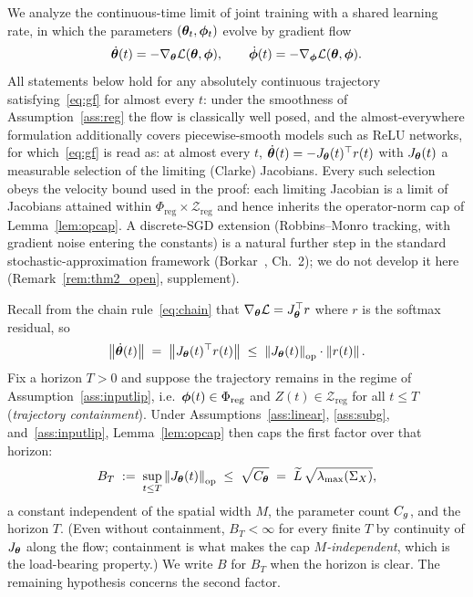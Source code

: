 We analyze the continuous-time limit of joint training with a shared
learning rate, in which the parameters $({\boldsymbol{\theta}}_t, {\boldsymbol{\phi}}_t)$ evolve
by gradient flow
\begin{equation}
\label{eq:gf}
    \dot{{\boldsymbol{\theta}}}(t) = -\nabla_{\boldsymbol{\theta}} \mathcal{L}({\boldsymbol{\theta}}, {\boldsymbol{\phi}}),
    \qquad
    \dot{{\boldsymbol{\phi}}}(t) = -\nabla_{\boldsymbol{\phi}} \mathcal{L}({\boldsymbol{\theta}}, {\boldsymbol{\phi}}).
\end{equation}
All statements below hold for any absolutely continuous trajectory
satisfying~\eqref{eq:gf} for almost every $t$: under the smoothness
of Assumption~\ref{ass:reg} the flow is classically well posed, and
the almost-everywhere formulation additionally covers
piecewise-smooth models such as ReLU networks, for
which~\eqref{eq:gf} is read as: at almost every $t$,
$\dot{{\boldsymbol{\theta}}}(t) = -J_{\boldsymbol{\theta}}(t)^\top r(t)$ with $J_{\boldsymbol{\theta}}(t)$ a
measurable selection of the limiting (Clarke) Jacobians. Every
such selection obeys the velocity bound used in the proof: each
limiting Jacobian is a limit of Jacobians attained within
$\Phi_{\mathrm{reg}} \times \mathcal{Z}_{\mathrm{reg}}$ and hence
inherits the operator-norm cap of Lemma~\ref{lem:opcap}. A discrete-SGD extension (Robbins--Monro tracking, with
gradient noise entering the constants) is a natural further step in
the standard stochastic-approximation framework
(Borkar~\cite{borkar2008stochastic}, Ch.~2); we do not develop it
here (Remark~\ref{rem:thm2_open}, supplement).

Recall from the chain rule~\eqref{eq:chain} that
$\nabla_{\boldsymbol{\theta}} \mathcal{L} = J_{\boldsymbol{\theta}}^\top r$ where $r$ is the softmax
residual, so
\begin{equation}
\label{eq:theta_grad_bound}
    \left\lVert\dot{{\boldsymbol{\theta}}}(t)\right\rVert
    \;=\; \left\lVert J_{\boldsymbol{\theta}}(t)^\top r(t)\right\rVert
    \;\leq\; \left\lVert J_{\boldsymbol{\theta}}(t)\right\rVert_{\mathrm{op}} \cdot \left\lVert r(t)\right\rVert.
\end{equation}
Fix a horizon $T > 0$ and suppose the trajectory remains in the
regime of Assumption~\ref{ass:inputlip}, i.e.\
${\boldsymbol{\phi}}(t) \in \Phi_{\mathrm{reg}}$ and $Z(t) \in
\mathcal{Z}_{\mathrm{reg}}$ for all $t \leq T$
(\emph{trajectory containment}). Under
Assumptions~\ref{ass:linear}, \ref{ass:subg},
and~\ref{ass:inputlip}, Lemma~\ref{lem:opcap} then caps the first
factor over that horizon:
\begin{equation}
\label{eq:bt}
    B_T \;:=\; \sup_{t \leq T} \left\lVert J_{\boldsymbol{\theta}}(t)\right\rVert_{\mathrm{op}}
    \;\leq\; \sqrt{C_{\boldsymbol{\theta}}}
    \;=\; \widetilde{L}\,\sqrt{\lambda_{\max}(\Sigma_X)},
\end{equation}
a constant independent of the spatial width $M$, the parameter count
$C_g$, and the horizon $T$. (Even without containment,
$B_T < \infty$ for every finite $T$ by continuity of $J_{\boldsymbol{\theta}}$
along the flow; containment is what makes the cap
\emph{$M$-independent}, which is the load-bearing property.) We write
$B$ for $B_T$ when the horizon is clear. The remaining hypothesis
concerns the second factor.

